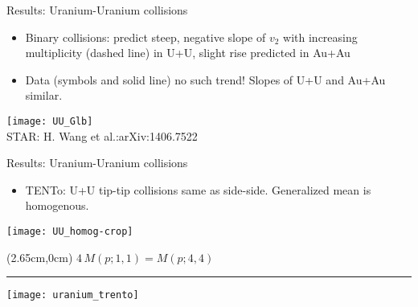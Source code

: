 \documentclass[svgnames]{beamer}
\newcommand{\trento}{T\raisebox{-.5ex}{R}ENTo}
\begin{document}
\begin{frame}{Results: Uranium-Uranium collisions}
  \begin{itemize}
   \item Binary collisions: predict steep, negative slope of $v_2$ with increasing multiplicity (dashed line) in U+U, slight rise predicted in Au+Au
   \vspace{0.1 in}
   \item Data (symbols and solid line) no such trend! Slopes of U+U and Au+Au similar.
  \end{itemize}
  \vspace{0.2 in}
  \centering
  \texttt{[image: UU\_Glb]} \\
  \footnotesize STAR: H. Wang et al.:arXiv:1406.7522
\end{frame}

\begin{frame}{Results: Uranium-Uranium collisions}
  \begin{itemize}
   \item {\trento}: U+U tip-tip collisions same as side-side. Generalized mean is homogenous.
  \end{itemize}
  \begin{center}
   \texttt{[image: UU\_homog-crop]}
  \end{center}
  
  \begin{textblock*}{0.5\textwidth}(2.65cm,0cm)
   $4\,M(p; 1,1) = M(p; 4,4)$
  \end{textblock*}
  \vspace{0.3 in}
  \hrule
  \centering
  \vspace{0.1 in}
  \texttt{[image: uranium\_trento]}
\end{frame}
\end{document}
